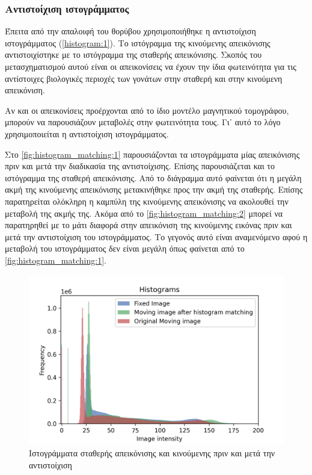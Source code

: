 \documentclass[a4paper,12pt]{article}
\begin{document}
\subsubsection{Αντιστοίχιση ιστογράμματος}

Έπειτα από την απαλοιφή του θορύβου χρησιμοποιήθηκε η αντιστοίχιση ιστογράμματος
(\ref{histogram:1}). Το ιστόγραμμα της κινούμενης απεικόνισης αντιστοιχίστηκε με
το ιστόγραμμα της σταθερής απεικόνισης. Σκοπός του μετασχηματισμού αυτού είναι
οι απεικονίσεις να έχουν την ίδια φωτεινότητα για τις αντίστοιχες βιολογικές
περιοχές των γονάτων στην σταθερή και στην κινούμενη απεικόνιση. 

Αν και οι απεικονίσεις προέρχονται από το ίδιο μοντέλο μαγνητικού τομογράφου,
μπορούν να παρουσιάζουν μεταβολές στην φωτεινότητα τους. Γι᾽ αυτό το λόγο
χρησιμοποιείται η αντιστοίχιση ιστογράμματος.

Στο \autoref{fig:histogram_matching:1} παρουσιάζονται τα ιστογράμματα μίας
απεικόνισης πριν και μετά την διαδικασία της αντιστοίχισης. Επίσης παρουσιάζεται
και το ιστόγραμμα της σταθερή απεικόνισης. Από το διάγραμμα αυτό φαίνεται ότι η
μεγάλη ακμή της κινούμενης απεικόνισης μετακινήθηκε προς την ακμή της σταθερής.
Επίσης παρατηρείται ολόκληρη η καμπύλη της κινούμενης απεικόνισης να ακολουθεί
την μεταβολή της ακμής της. Ακόμα από το \autoref{fig:histogram_matching:2}
μπορεί να παρατηρηθεί με το μάτι διαφορά στην απεικόνιση της κινούμενης εικόνας
πριν και μετά την αντιστοίχιση του ιστογράμματος. Το γεγονός αυτό είναι
αναμενόμενο αφού η μεταβολή του ιστογράμματος δεν είναι μεγάλη όπως φαίνεται από
το \autoref{fig:histogram_matching:1}.


\begin{figure}[H]
    \centering
    \includegraphics[width=\linewidth]{histogram_plot.png}
    \caption{Ιστογράμματα σταθερής απεικόνισης και κινούμενης πριν και μετά την
             αντιστοίχιση}
    \label{fig:histogram_matching:1}
\end{figure}
\end{document}
